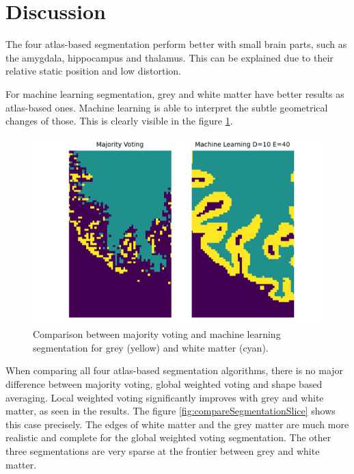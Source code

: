 \section*{Discussion}
The four atlas-based segmentation perform better with small brain parts, such as the amygdala, hippocampus and thalamus. This can be explained due to their relative static position and low distortion. 

For machine learning segmentation, grey and white matter have better results as atlas-based ones. Machine learning is able to interpret the subtle geometrical changes of those. This is clearly visible in the figure \ref{fig:compareGreyMatter}.

\begin{figure}[h!]
	\centering
	\includegraphics[width=\linewidth]{img/compareGreyMatter}
	\caption{Comparison between majority voting and machine learning segmentation for grey (yellow) and white matter (cyan).}
	\label{fig:compareGreyMatter}
\end{figure}

When comparing all four atlas-based segmentation algorithms, there is no major difference between majority voting, global weighted voting and shape based averaging. Local weighted voting significantly improves with grey and white matter, as seen in the results. The figure \ref{fig:compareSegmentationSlice} shows this case precisely. The edges of white matter and the grey matter are much more realistic and complete for the global weighted voting segmentation. The other three segmentations are very sparse at the frontier between grey and white matter.

